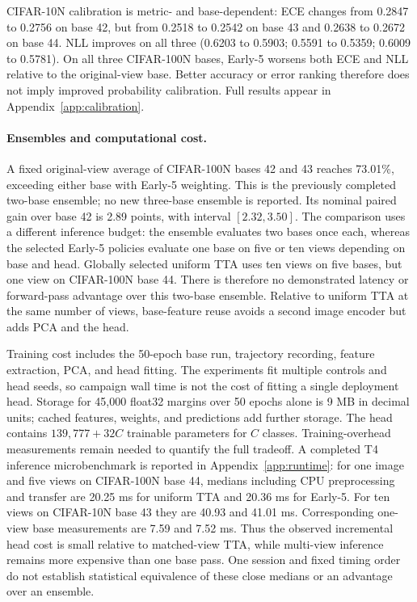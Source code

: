 CIFAR-10N calibration is metric- and base-dependent: ECE changes from 0.2847 to 0.2756 on base 42, but from 0.2518 to 0.2542 on base 43 and 0.2638 to 0.2672 on base 44. NLL improves on all three (0.6203 to 0.5903; 0.5591 to 0.5359; 0.6009 to 0.5781). On all three CIFAR-100N bases, Early-5 worsens both ECE and NLL relative to the original-view base. Better accuracy or error ranking therefore does not imply improved probability calibration. Full results appear in Appendix~\ref{app:calibration}.

\paragraph{Ensembles and computational cost.}
A fixed original-view average of CIFAR-100N bases 42 and 43 reaches 73.01\%, exceeding either base with Early-5 weighting. This is the previously completed two-base ensemble; no new three-base ensemble is reported. Its nominal paired gain over base 42 is 2.89 points, with interval $[2.32,3.50]$. The comparison uses a different inference budget: the ensemble evaluates two bases once each, whereas the selected Early-5 policies evaluate one base on five or ten views depending on base and head. Globally selected uniform TTA uses ten views on five bases, but one view on CIFAR-100N base 44. There is therefore no demonstrated latency or forward-pass advantage over this two-base ensemble. Relative to uniform TTA at the same number of views, base-feature reuse avoids a second image encoder but adds PCA and the head.

Training cost includes the 50-epoch base run, trajectory recording, feature extraction, PCA, and head fitting. The experiments fit multiple controls and head seeds, so campaign wall time is not the cost of fitting a single deployment head. Storage for 45,000 float32 margins over 50 epochs alone is 9 MB in decimal units; cached features, weights, and predictions add further storage. The head contains $139{,}777+32C$ trainable parameters for $C$ classes. Training-overhead measurements remain needed to quantify the full tradeoff. A completed T4 inference microbenchmark is reported in Appendix~\ref{app:runtime}: for one image and five views on CIFAR-100N base 44, medians including CPU preprocessing and transfer are 20.25 ms for uniform TTA and 20.36 ms for Early-5. For ten views on CIFAR-10N base 43 they are 40.93 and 41.01 ms. Corresponding one-view base measurements are 7.59 and 7.52 ms. Thus the observed incremental head cost is small relative to matched-view TTA, while multi-view inference remains more expensive than one base pass. One session and fixed timing order do not establish statistical equivalence of these close medians or an advantage over an ensemble.

